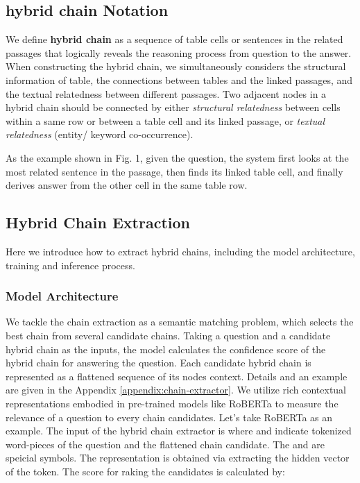 \documentclass[11pt]{article}
\begin{document}
	\subsection{hybrid chain Notation}
We define \textbf{hybrid chain} as a sequence of table cells or sentences in the related passages that logically reveals the reasoning process from question to the answer. 
	When constructing the hybrid chain, we simultaneously considers the structural information of table, the connections between tables and the linked passages, and the textual relatedness between different passages.
	Two adjacent nodes in a hybrid chain should be connected by either \textit{structural relatedness} between cells within a same row or between a table cell and its linked passage, or \textit{textual relatedness} (entity/ keyword co-occurrence). 
	
As the example shown in Fig. 1, given the question, the system first looks at the most related sentence in the passage, then finds its linked table cell, and finally derives answer from the other cell in the same table row.
	
	\fi
	
	\subsection{Hybrid Chain Extraction}\label{sec:ec-extractor}
	Here we introduce how to extract hybrid chains, including the model architecture, training and inference process.
\subsubsection{Model Architecture}
	We tackle the chain extraction as a semantic matching problem, which selects the best chain from several candidate chains.
Taking a question and a candidate hybrid chain as the inputs, the model calculates the confidence score of the hybrid chain for answering the question. 
	Each candidate hybrid chain is represented as a flattened sequence of its nodes context. Details and an example are given in the Appendix \ref{appendix:chain-extractor}. 
We utilize rich contextual representations embodied in pre-trained models like RoBERTa \cite{Liu2019RoBERTaAR} to measure the relevance of a question to every chain candidates. 
	Let's take RoBERTa as an example. The input of the hybrid chain extractor is 
	where  and  indicate tokenized word-pieces of the question and the flattened   chain candidate. 
	The  and  are speicial symbols. The representation  is obtained via extracting the hidden vector of the  token. 
	The score  for raking the candidates is calculated by:
	
\end{document}
